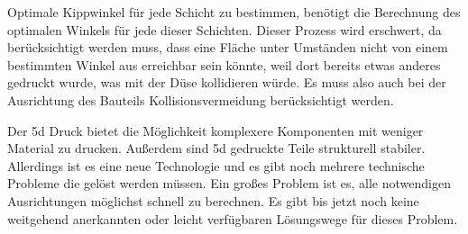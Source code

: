 Optimale Kippwinkel für jede Schicht zu bestimmen, benötigt die Berechnung des optimalen Winkels für jede dieser Schichten. Dieser Prozess wird erschwert, da berücksichtigt werden muss, 
dass eine Fläche unter Umständen nicht von einem bestimmten Winkel aus erreichbar sein könnte, weil dort bereits etwas anderes gedruckt wurde, was mit der Düse kollidieren würde. %
Es muss also auch bei der Ausrichtung des Bauteils Kollisionsvermeidung berücksichtigt werden.

\smallskip

Der 5d Druck bietet die Möglichkeit komplexere Komponenten mit weniger Material zu drucken. Außerdem sind 5d gedruckte Teile strukturell stabiler. Allerdings ist es eine neue Technologie und es gibt noch mehrere technische Probleme die gelöst werden müssen. 
Ein großes Problem ist es, alle notwendigen Ausrichtungen möglichst schnell zu berechnen. Es gibt bis jetzt noch keine weitgehend anerkannten oder leicht verfügbaren Lösungswege für dieses Problem.